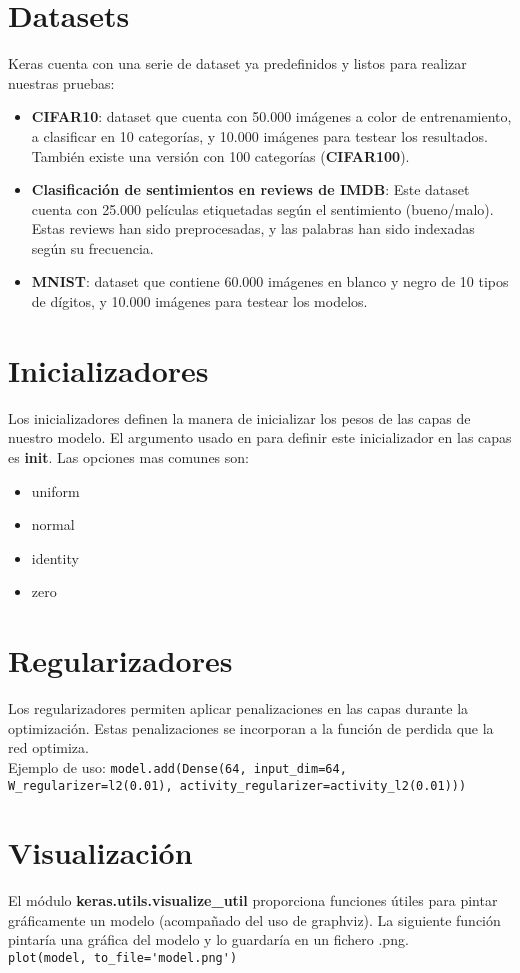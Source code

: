 \section{Datasets}
Keras cuenta con una serie de dataset ya predefinidos y listos para realizar nuestras pruebas:
\begin{itemize}
\item \textbf{CIFAR10}: dataset que cuenta con 50.000 imágenes a color de entrenamiento, a clasificar en 10 categorías, y 10.000 imágenes para testear los resultados. También existe una versión con 100 categorías (\textbf{CIFAR100}).
\item \textbf{Clasificación de sentimientos en reviews de IMDB}: Este dataset cuenta con 25.000 películas etiquetadas según el sentimiento (bueno/malo). Estas reviews han sido preprocesadas, y las palabras han sido indexadas según su frecuencia.
\item \textbf{MNIST}: dataset que contiene 60.000 imágenes en blanco y negro de 10 tipos de dígitos, y 10.000 imágenes para testear los modelos.
\end{itemize}
\section{Inicializadores}
Los inicializadores definen la manera de inicializar los pesos de las capas de nuestro modelo. El argumento usado en para definir este inicializador en las capas es \textbf{init}. Las opciones mas comunes son:
\begin{itemize}[noitemsep]
\item uniform
\item normal
\item identity
\item zero
\end{itemize}
\section{Regularizadores}
Los regularizadores permiten aplicar penalizaciones en las capas durante la optimización. Estas penalizaciones se incorporan a la función de perdida que la red optimiza.\\
Ejemplo de uso:
\lstinline{model.add(Dense(64, input_dim=64, W_regularizer=l2(0.01), activity_regularizer=activity_l2(0.01)))}
\section{Visualización}
El módulo \textbf{keras.utils.visualize_util} proporciona funciones útiles para pintar gráficamente un modelo (acompañado del uso de graphviz). La siguiente función pintaría una gráfica del modelo y lo guardaría en un fichero .png.\\
\lstinline{plot(model, to_file='model.png')}
